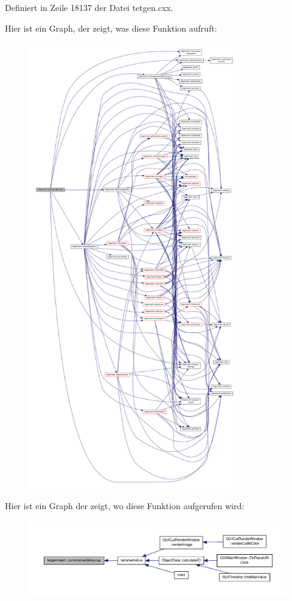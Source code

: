 Definiert in Zeile 18137 der Datei tetgen.\-cxx.



Hier ist ein Graph, der zeigt, was diese Funktion aufruft\-:\nopagebreak
\begin{figure}[H]
\begin{center}
\leavevmode
\includegraphics[height=550pt]{classtetgenmesh_aab64d62b3d2b048a38158fb2bf678624_cgraph}
\end{center}
\end{figure}




Hier ist ein Graph der zeigt, wo diese Funktion aufgerufen wird\-:\nopagebreak
\begin{figure}[H]
\begin{center}
\leavevmode
\includegraphics[width=350pt]{classtetgenmesh_aab64d62b3d2b048a38158fb2bf678624_icgraph}
\end{center}
\end{figure}


